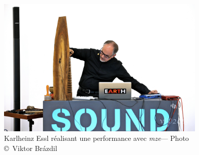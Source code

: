\documentclass[a4paper,12pt]{article}
\newcommand{\maze}[0]{\emph{m\symbol{64}ze\textdegree2}}
\begin{document}
\begin{figure}[h!]
\begin{center}
\includegraphics[width=10cm]{images/performance.jpg}
\caption{\footnotesize Karlheinz Essl réalisant une performance avec \maze --- Photo \copyright~Viktor Br\'azdil}
\label{performancephoto}
\end{center}
\end{figure}
\end{document}
